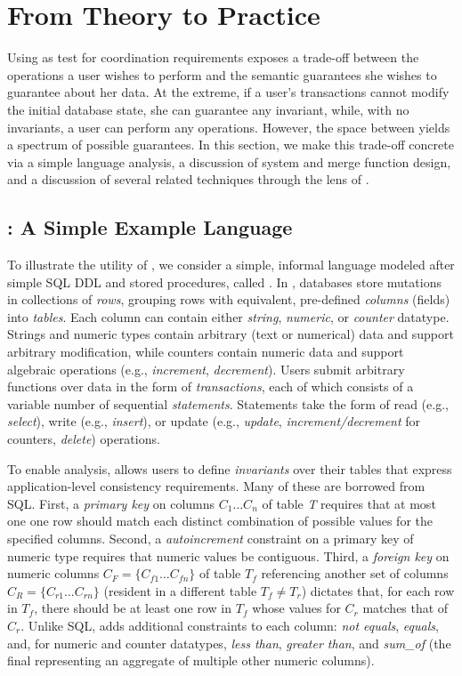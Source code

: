 
\section{From Theory to Practice}
\label{sec:bcc-practice}

Using \iconfluence as test for coordination requirements exposes a
trade-off between the operations a user wishes to perform and the
semantic guarantees she wishes to guarantee about her data. At the
extreme, if a user's transactions cannot modify the initial database
state, she can guarantee any invariant, while, with no invariants, a
user can perform any operations. However, the space between yields a
spectrum of possible \iconfluent guarantees. In this section, we make
this trade-off concrete via a simple language analysis, a discussion
of system and merge function design, and a discussion of several
related techniques through the lens of \iconfluence.

\subsection{\lang: A Simple Example Language}

To illustrate the utility of \iconfluence, we consider a simple,
informal language modeled after simple SQL DDL and stored procedures,
called \lang. In \lang, databases store mutations in collections of
\textit{rows}, grouping rows with equivalent, pre-defined
\textit{columns} (fields) into \textit{tables}. Each column can
contain either \textit{string}, \textit{numeric}, or \textit{counter}
datatype. Strings and numeric types contain arbitrary (text or
numerical) data and support arbitrary modification, while counters
contain numeric data and support algebraic operations (e.g.,
\textit{increment}, \textit{decrement}). Users submit arbitrary
functions over data in the form of \textit{transactions}, each of
which consists of a variable number of sequential
\textit{statements}. Statements take the form of read (e.g.,
\textit{select}), write (e.g., \textit{insert}), or update (e.g.,
\textit{update}, \textit{increment/decrement} for counters,
\textit{delete}) operations.

To enable \cfreedom analysis, \lang allows users to define
\textit{invariants} over their tables that express application-level
consistency requirements. Many of these are borrowed from SQL. First,
a \textit{primary key} on columns $C_1 \dots C_n$ of table \textit{T}
requires that at most one one row should match each distinct
combination of possible values for the specified columns. Second, a
\textit{autoincrement} constraint on a primary key of numeric type
requires that numeric values be contiguous. Third, a \textit{foreign
  key} on numeric columns $C_F=\{C_{f1}\dots C_{fn}\}$ of table $T_f$
referencing another set of columns $C_R = \{C_{r1}\dots C_{rn}\}$ (resident in a
different table $T_f \neq T_r$) dictates that, for each row in $T_f$,
there should be at least one row in $T_f$ whose values for $C_r$
matches that of $C_r$. Unlike SQL, \lang adds additional constraints
to each column: \textit{not equals}, \textit{equals}, and, for numeric
and counter datatypes, \textit{less than}, \textit{greater than}, and
\textit{sum\_of} (the final representing an aggregate of multiple
other numeric columns).

